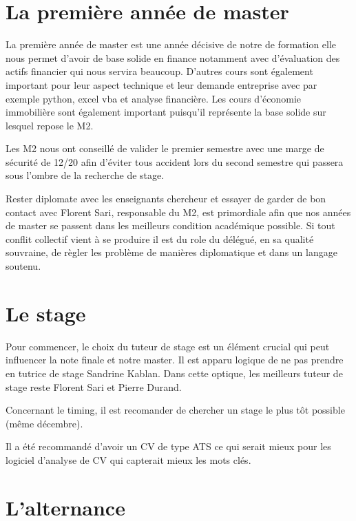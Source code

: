 \documentclass[a4paper, 12pt]{report}
\begin{document}
\chapter{La première année de master}

La première année de master est une année décisive de notre de formation elle nous permet d'avoir de base solide en finance notamment avec d'évaluation des actifs financier qui nous servira beaucoup. D'autres cours sont également important pour leur aspect technique et leur demande entreprise avec par exemple python, excel vba et analyse financière. Les cours d'économie immobilière sont également important puisqu'il représente la base solide sur lesquel repose le M2. 

Les M2 nous ont conseillé de valider le premier semestre avec une marge de sécurité de 12/20 afin d'éviter tous accident lors du second semestre qui passera sous l'ombre de la recherche de stage. 

Rester diplomate avec les enseignants chercheur et essayer de garder de bon contact avec Florent Sari, responsable du M2, est primordiale afin que nos années de master se passent dans les meilleurs condition académique possible.  Si tout conflit collectif vient à se produire il est du role du délégué, en sa qualité souvraine, de règler les problème de manières diplomatique et dans un langage soutenu. 


\chapter{Le stage}

Pour commencer, le choix du tuteur de stage est un élément crucial qui peut influencer la note finale et notre master. Il est apparu logique de ne pas prendre en tutrice de stage Sandrine Kablan. Dans cette optique, les meilleurs tuteur de stage reste Florent Sari et Pierre Durand. 

Concernant le timing, il est recomander de chercher un stage le plus tôt possible (même décembre). 

Il a été recommandé d'avoir un CV de type ATS ce qui serait mieux pour les logiciel d'analyse de CV qui capterait mieux les mots clés. 

\chapter{L'alternance}
	
\end{document}

